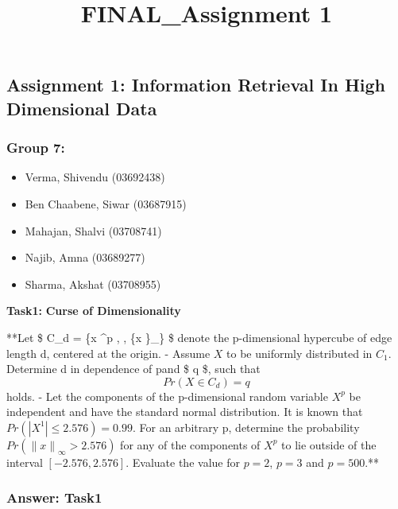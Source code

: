 \documentclass[11pt]{article}
\title{FINAL\_Assignment 1}
\providecommand{\tightlist}{%
      \setlength{\itemsep}{0pt}\setlength{\parskip}{0pt}}
\begin{document}
    
    
    \maketitle
    
    

    
    \subsection{\texorpdfstring{\textbf{Assignment 1: Information Retrieval
In High Dimensional
Data}}{Assignment 1: Information Retrieval In High Dimensional Data}}\label{assignment-1-information-retrieval-in-high-dimensional-data}

\subsubsection{Group 7:}\label{group-7}

\begin{itemize}
\tightlist
\item
  Verma, Shivendu (03692438)
\item
  Ben Chaabene, Siwar (03687915)
\item
  Mahajan, Shalvi (03708741)
\item
  Najib, Amna (03689277)
\item
  Sharma, Akshat (03708955)
\end{itemize}

    

    \textbf{Task1:} \textbf{Curse of Dimensionality }

**Let \$ C\_d = \{x \in {}\^{}p , \textbar{} , \{\lVert x
\rVert\}\_\infty \leq {}\} \$ denote the p-dimensional
hypercube of edge length d, centered at the origin. \textbf{ }- Assume
\(X\) to be uniformly distributed in \(C_1\). Determine d in dependence
of pand \$ q \in [0, 1]\$, such that \[Pr(X \in C_d) = q\]
holds.\textbf{ }- Let the components of the p-dimensional random
variable \(X^p\) be independent and have the standard normal
distribution. It is known that \(Pr(|X^1| \leq 2.576) = 0.99\). For an
arbitrary p, determine the probability
\(Pr({\lVert x \rVert}_\infty > 2.576)\) for any of the components of
\(X^p\) to lie outside of the interval \([−2.576, 2.576]\). Evaluate the
value for \(p = 2\), \(p = 3\) and \(p = 500\).**

    \subsubsection{Answer: Task1}\label{answer-task1}
\end{document}
